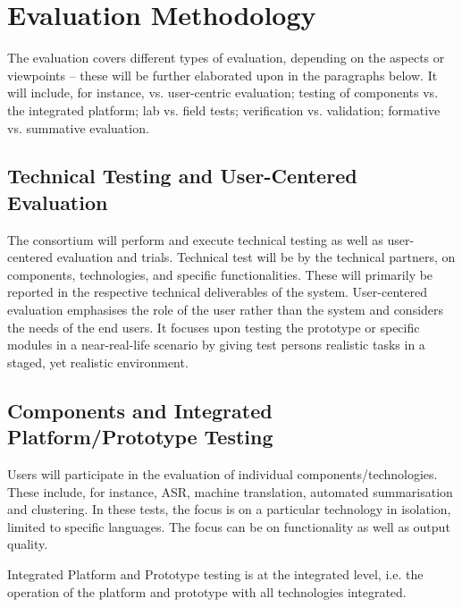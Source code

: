\section{Evaluation Methodology}


The \SUMMA evaluation  covers different types of evaluation, depending on the aspects or viewpoints – these will be further elaborated upon in the paragraphs below. It will include, for instance,  vs. user-centric evaluation; testing of components vs. the integrated platform; lab vs. field tests; verification vs. validation;  formative vs. summative evaluation. 

\subsection{Technical Testing and User-Centered Evaluation}
The consortium will perform and execute technical testing as well as user-centered evaluation and trials. Technical test will be  by the technical partners, on components, technologies, and specific functionalities. These will primarily be reported in the respective technical deliverables of the system. User-centered evaluation emphasises the role of the user rather than the system and considers the needs of the end users. It focuses upon testing the prototype or specific modules in a near-real-life scenario by giving test persons realistic tasks in a staged, yet realistic environment.

\subsection{Components and Integrated Platform/Prototype Testing}
Users will participate in the evaluation of  individual components/technologies. These include, for instance, ASR, machine translation, automated summarisation and clustering. In these tests, the focus is on a particular technology in isolation, limited to specific languages. The focus can be on functionality as well as output quality.

Integrated Platform and Prototype testing is at the integrated level, i.e. the operation of the platform and prototype with all technologies integrated.

